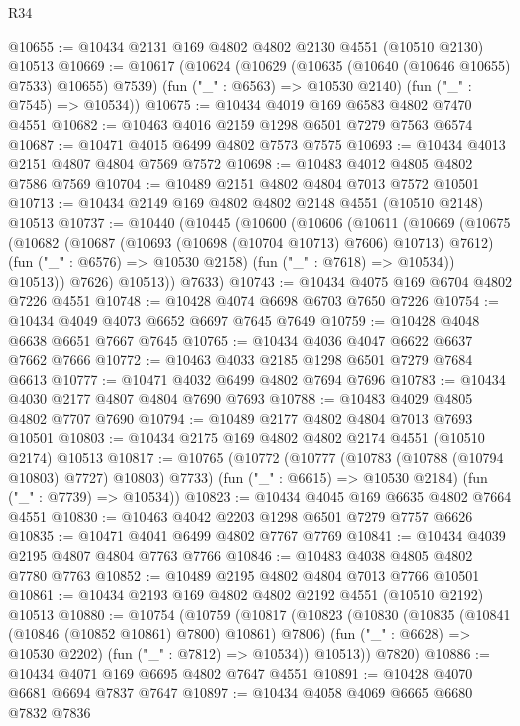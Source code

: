 \begin{lexlean}{R34}
\begin{coremodule}
@10655 := @10434 @2131 @169 @4802 @4802 @2130 @4551 (@10510 @2130) @10513
@10669 := @10617
    (@10624
      (@10629 (@10635 (@10640 (@10646 @10655) @7533) @10655) @7539)
      (fun ("_" : @6563) => @10530 @2140)
      (fun ("_" : @7545) => @10534))
@10675 := @10434 @4019 @169 @6583 @4802 @7470 @4551
@10682 := @10463 @4016 @2159 @1298 @6501 @7279 @7563 @6574
@10687 := @10471 @4015 @6499 @4802 @7573 @7575
@10693 := @10434 @4013 @2151 @4807 @4804 @7569 @7572
@10698 := @10483 @4012 @4805 @4802 @7586 @7569
@10704 := @10489 @2151 @4802 @4804 @7013 @7572 @10501
@10713 := @10434 @2149 @169 @4802 @4802 @2148 @4551 (@10510 @2148) @10513
@10737 := @10440
    (@10445
      (@10600
        (@10606
          (@10611
            (@10669
              (@10675
                (@10682
                  (@10687 (@10693 (@10698 (@10704 @10713) @7606) @10713) @7612)
                  (fun ("_" : @6576) => @10530 @2158)
                  (fun ("_" : @7618) => @10534))
                @10513))
            @7626)
          @10513))
      @7633)
@10743 := @10434 @4075 @169 @6704 @4802 @7226 @4551
@10748 := @10428 @4074 @6698 @6703 @7650 @7226
@10754 := @10434 @4049 @4073 @6652 @6697 @7645 @7649
@10759 := @10428 @4048 @6638 @6651 @7667 @7645
@10765 := @10434 @4036 @4047 @6622 @6637 @7662 @7666
@10772 := @10463 @4033 @2185 @1298 @6501 @7279 @7684 @6613
@10777 := @10471 @4032 @6499 @4802 @7694 @7696
@10783 := @10434 @4030 @2177 @4807 @4804 @7690 @7693
@10788 := @10483 @4029 @4805 @4802 @7707 @7690
@10794 := @10489 @2177 @4802 @4804 @7013 @7693 @10501
@10803 := @10434 @2175 @169 @4802 @4802 @2174 @4551 (@10510 @2174) @10513
@10817 := @10765
    (@10772
      (@10777 (@10783 (@10788 (@10794 @10803) @7727) @10803) @7733)
      (fun ("_" : @6615) => @10530 @2184)
      (fun ("_" : @7739) => @10534))
@10823 := @10434 @4045 @169 @6635 @4802 @7664 @4551
@10830 := @10463 @4042 @2203 @1298 @6501 @7279 @7757 @6626
@10835 := @10471 @4041 @6499 @4802 @7767 @7769
@10841 := @10434 @4039 @2195 @4807 @4804 @7763 @7766
@10846 := @10483 @4038 @4805 @4802 @7780 @7763
@10852 := @10489 @2195 @4802 @4804 @7013 @7766 @10501
@10861 := @10434 @2193 @169 @4802 @4802 @2192 @4551 (@10510 @2192) @10513
@10880 := @10754
    (@10759
      (@10817
        (@10823
          (@10830
            (@10835 (@10841 (@10846 (@10852 @10861) @7800) @10861) @7806)
            (fun ("_" : @6628) => @10530 @2202)
            (fun ("_" : @7812) => @10534))
          @10513))
      @7820)
@10886 := @10434 @4071 @169 @6695 @4802 @7647 @4551
@10891 := @10428 @4070 @6681 @6694 @7837 @7647
@10897 := @10434 @4058 @4069 @6665 @6680 @7832 @7836

\end{coremodule}
\end{lexlean}
